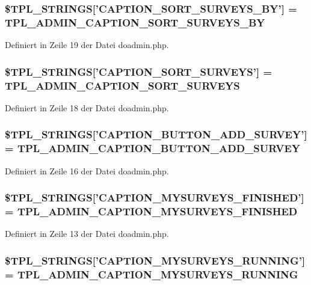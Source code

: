 \subsubsection{\setlength{\rightskip}{0pt plus 5cm}\$TPL\_\-STRINGS['CAPTION\_\-SORT\_\-SURVEYS\_\-BY'] = {\bf TPL\_\-ADMIN\_\-CAPTION\_\-SORT\_\-SURVEYS\_\-BY}}\label{doadmin_8php_94a5cf2d5e00990da2d11013ebd90ac7}




Definiert in Zeile 19 der Datei doadmin.php.
\subsubsection{\setlength{\rightskip}{0pt plus 5cm}\$TPL\_\-STRINGS['CAPTION\_\-SORT\_\-SURVEYS'] = {\bf TPL\_\-ADMIN\_\-CAPTION\_\-SORT\_\-SURVEYS}}\label{doadmin_8php_b9a26ddab29e852efac383d6eae07bd0}




Definiert in Zeile 18 der Datei doadmin.php.
\subsubsection{\setlength{\rightskip}{0pt plus 5cm}\$TPL\_\-STRINGS['CAPTION\_\-BUTTON\_\-ADD\_\-SURVEY'] = {\bf TPL\_\-ADMIN\_\-CAPTION\_\-BUTTON\_\-ADD\_\-SURVEY}}\label{doadmin_8php_db8f21fccc808fd76b8500c931aa805d}




Definiert in Zeile 16 der Datei doadmin.php.
\subsubsection{\setlength{\rightskip}{0pt plus 5cm}\$TPL\_\-STRINGS['CAPTION\_\-MYSURVEYS\_\-FINISHED'] = {\bf TPL\_\-ADMIN\_\-CAPTION\_\-MYSURVEYS\_\-FINISHED}}\label{doadmin_8php_10cc234b1c962b8a41c8e127da00cb15}




Definiert in Zeile 13 der Datei doadmin.php.
\subsubsection{\setlength{\rightskip}{0pt plus 5cm}\$TPL\_\-STRINGS['CAPTION\_\-MYSURVEYS\_\-RUNNING'] = {\bf TPL\_\-ADMIN\_\-CAPTION\_\-MYSURVEYS\_\-RUNNING}}\label{doadmin_8php_f64e94061e69c2ed3b03ec93f7e517c9}




